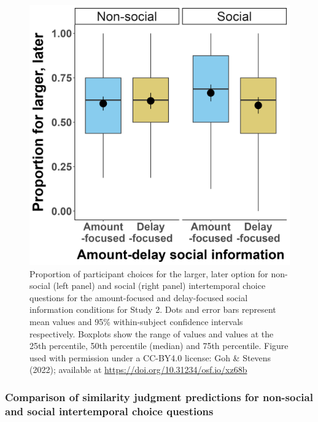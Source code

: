 \documentclass[
  pub,floatsintext]{apa6}
\begin{document}
\begin{figure}
\includegraphics[width=1\linewidth]{figures/itc_social_info_2} \caption{Proportion of participant choices for the larger, later option for non-social (left panel) and social (right panel) intertemporal choice questions for the amount-focused and delay-focused social information conditions for Study 2. Dots and error bars represent mean values and 95\% within-subject confidence intervals respectively. Boxplots show the range of values and values at the 25th percentile, 50th percentile (median) and 75th percentile. Figure used with permission under a CC-BY4.0 license: Goh \& Stevens (2022); available at \url{https://doi.org/10.31234/osf.io/xz68b}}\label{fig:socialinfoitccomparison2}
\end{figure}

\hypertarget{comparison-of-similarity-judgment-predictions-for-non-social-and-social-intertemporal-choice-questions-1}{%
\subsubsection{Comparison of similarity judgment predictions for non-social and social intertemporal choice questions}\label{comparison-of-similarity-judgment-predictions-for-non-social-and-social-intertemporal-choice-questions-1}}
\end{document}

